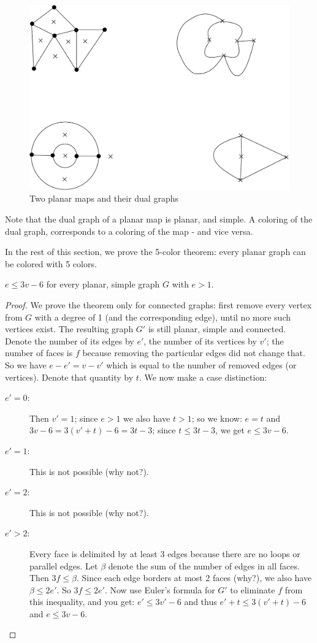 \begin{figure}[ht]
	\centering
	\includegraphics[width=0.6\linewidth,keepaspectratio]{dual1}
	\caption{Two planar maps and their dual graphs\label{dual1}}
\end{figure}

Note that the dual graph of a planar map is planar, and simple. A
coloring of the dual graph, corresponds to a coloring of the map - and
vice versa.

In the rest of this section, we prove the 5-color theorem: every
planar graph can be colored with 5 colors.

 \begin{theorem} $e \leq 3v-6$ for every planar, simple graph
     $G$ with $e > 1$.\label{euler}
\end{theorem}
\begin{proof}
We prove the theorem only for connected graphs: first remove
every vertex from $G$ with a degree of 1 (and the corresponding edge),
until no more such vertices exist. The resulting graph $G'$ is still
planar, simple and connected. Denote the number of its edges by $e'$,
the number of its vertices by $v'$; the number of faces is $f$
because removing the particular edges did not change that. So we have
$e-e'=v-v'$ which is equal to the number of removed edges (or
vertices). Denote that quantity by $t$. We now make a case distinction:
\begin{description}
\item[\underline{$e'=0$}:]
Then $v' = 1$; since $e > 1$ we also have $t > 1$;
so we know: $e = t$ and $3v-6 = 3(v'+t) -6 = 3t-3$; since $t \leq
3t-3$, we get $e \leq 3v-6$.

\item[\underline{$e'=1$}:]
This is not possible (why not?).
\item[\underline{$e'=2$}:]
This is not possible (why not?).

\item[\underline{$e' > 2$}:]
Every face is delimited by at least 3 edges because
there are no loops or parallel edges. Let $\beta$ denote the sum of
the number of edges in all faces. Then $3f \leq \beta$. Since each
edge borders at most 2 faces (why?), we also have $\beta \leq 2e'$. So
$3f \leq 2e'$. Now use Euler's formula for $G'$ to eliminate $f$
from this inequality, and you get: $e' \leq 3v'-6$ and thus $e'+t
\leq 3(v'+t)-6$ and $e \leq 3v-6$.\vspace{-2em}
\end{description}
\end{proof}

